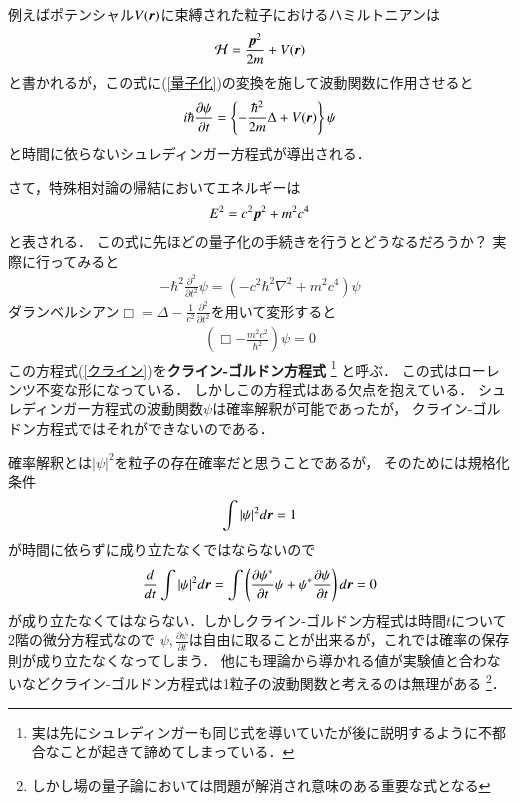 \documentclass[a4paper,11pt]{jsarticle}
\numberwithin{equation}{section}
\newcommand{\bvec}[1]{\mbox{\boldmath $#1$}}
\begin{document}
例えばポテンシャル$V(\bvec{r})$に束縛された粒子におけるハミルトニアンは
\begin{align}
  \mathcal{H}= \frac{\bvec{p}^2}{2m} + V(\bvec{r})
\end{align}と書かれるが，この式に(\ref{量子化})の変換を施して波動関数に作用させると
\begin{align}
  i\hbar \frac{\partial \psi}{\partial t} = \left\{-\frac{\hbar^2}{2m}\Delta +V(\bvec{r})\right\}\psi
\end{align}
と時間に依らないシュレディンガー方程式が導出される．

さて，特殊相対論の帰結においてエネルギーは
\begin{align}
  E^2 = c^2\bvec{p}^2 + m^2c^4
  \label{E}
\end{align}
と表される．
この式に先ほどの量子化の手続きを行うとどうなるだろうか？
実際に行ってみると
\begin{align}
  -\hbar^2 \frac{\partial^2 }{\partial t^2}\psi = (-c^2\hbar^2\nabla^2+m^2c^4) \psi
\end{align}
ダランベルシアン$\Box = \Delta -\frac{1}{c^2}\frac{\partial^2 }{\partial t^2}$を用いて変形すると
\begin{align}
  \left(\Box - \frac{m^2c^2}{\hbar^2}\right) \psi = 0
  \label{クライン}
\end{align}
この方程式(\ref{クライン})を\textbf{クライン-ゴルドン方程式}
\footnote{実は先にシュレディンガーも同じ式を導いていたが後に説明するように不都合なことが起きて諦めてしまっている．}
と呼ぶ．
この式はローレンツ不変な形になっている．
しかしこの方程式はある欠点を抱えている．
シュレディンガー方程式の波動関数$\psi$は確率解釈が可能であったが，
クライン-ゴルドン方程式ではそれができないのである．

確率解釈とは$|\psi|^2$を粒子の存在確率だと思うことであるが，
そのためには規格化条件
\begin{align}
  \int |\psi|^2 d\bvec{r} = 1
\end{align}
が時間に依らずに成り立たなくではならないので
\begin{align}
  \frac{d}{dt} \int |\psi|^2 d\bvec{r} = 
  \int \left(\frac{\partial \psi^*}{\partial t}\psi + \psi^*\frac{\partial \psi}{\partial t}\right)d\bvec{r} = 0
\end{align}
が成り立たなくてはならない．しかしクライン-ゴルドン方程式は時間$t$について2階の微分方程式なので
$\psi,\frac{\partial \psi}{\partial t}$は自由に取ることが出来るが，これでは確率の保存則が成り立たなくなってしまう．
他にも理論から導かれる値が実験値と合わないなどクライン-ゴルドン方程式は1粒子の波動関数と考えるのは無理がある
\footnote{しかし場の量子論においては問題が解消され意味のある重要な式となる}．
\end{document}
